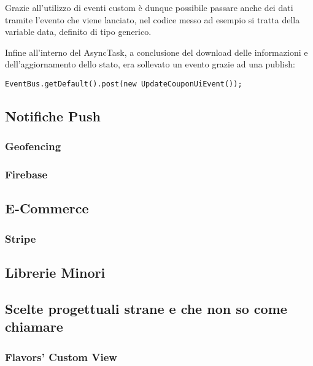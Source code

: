 Grazie all'utilizzo di eventi custom è dunque possibile passare anche dei dati tramite l'evento che viene lanciato, nel codice messo ad esempio si tratta della variable data, definito di tipo generico.

Infine all'interno del AsyncTask, a conclusione del download delle informazioni e dell'aggiornamento dello stato, era sollevato un evento grazie ad una publish:

\begin{lstlisting}
EventBus.getDefault().post(new UpdateCouponUiEvent());
\end{lstlisting}

\subsection{Notifiche Push}

\subsubsection{Geofencing}

\subsubsection{Firebase}

\subsection{E-Commerce}

\subsubsection{Stripe}

\subsection{Librerie Minori}

\subsection{Scelte progettuali strane e che non so come chiamare}

\subsubsection{Flavors’ Custom View}

\newpage

